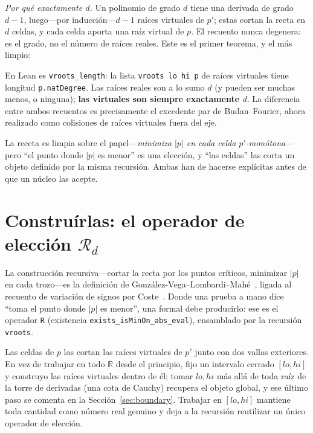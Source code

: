 \documentclass[11pt]{article}
\newcommand{\lean}[1]{\texttt{#1}}
\newcommand{\R}{\mathbb{R}}
\newcommand{\Rd}{\mathcal{R}}
\newcommand{\keyeq}[1]{\begin{center}\keybox{$\displaystyle #1$}\end{center}}
\begin{document}
\emph{Por qu\'e exactamente $d$.} Un polinomio de grado $d$ tiene una derivada de grado $d-1$,
luego---por inducci\'on---$d-1$ ra\'ices virtuales de $p'$; estas cortan la recta en $d$ celdas, y
cada celda aporta una ra\'iz virtual de $p$. El recuento nunca degenera: es el grado, no el n\'umero
de ra\'ices reales. Este es el primer teorema, y el m\'as limpio:
\keyeq{\#\,\{\text{ra\'ices virtuales de }p\} \;=\; \deg p .}
En Lean es \lean{vroots\_length}: la lista \lean{vroots lo hi p} de ra\'ices virtuales tiene longitud
\lean{p.natDegree}. Las ra\'ices reales son a lo sumo $d$ (y pueden ser muchas menos, o ninguna);
\textbf{las virtuales son siempre exactamente $d$}. La diferencia entre ambos recuentos es precisamente
el excedente par de Budan--Fourier, ahora realizado como colisiones de ra\'ices virtuales fuera del
eje.

La receta es limpia sobre el papel---\emph{minimiza $|p|$ en cada celda $p'$-mon\'otona}---pero ``el
punto donde $|p|$ es menor'' es una elecci\'on, y ``las celdas'' las corta un objeto definido por la
misma recursi\'on. Ambas han de hacerse expl\'icitas antes de que un n\'ucleo las acepte.

\section{Constru\'irlas: el operador de elecci\'on \texorpdfstring{$\Rd_d$}{R\_d}}\label{sec:q2}

La construcci\'on recursiva---cortar la recta por los puntos cr\'iticos, minimizar $|p|$ en cada
trozo---es la definici\'on de Gonz\'alez-Vega--Lombardi--Mah\'e~\cite{glm}, ligada al recuento de
variaci\'on de signos por Coste~\cite{coste}. Donde una prueba a mano dice ``toma el punto donde $|p|$
es menor'', una formal debe producirlo: ese es el operador \lean{R} (existencia
\lean{exists\_isMinOn\_abs\_eval}), ensamblado por la recursi\'on \lean{vroots}.

Las celdas de $p$ las cortan las ra\'ices virtuales de $p'$ junto con
dos vallas exteriores. En vez de trabajar en todo $\R$ desde el principio, fijo un intervalo cerrado
$[lo,hi]$ y construyo las ra\'ices virtuales dentro de \'el; tomar $lo,hi$ m\'as all\'a de toda ra\'iz
de la torre de derivadas (una cota de Cauchy) recupera el objeto global, y ese \'ultimo paso se
comenta en la Secci\'on~\ref{sec:boundary}. Trabajar en $[lo,hi]$ mantiene toda cantidad como n\'umero
real genuino y deja a la recursi\'on reutilizar un \'unico operador de elecci\'on.
\end{document}
